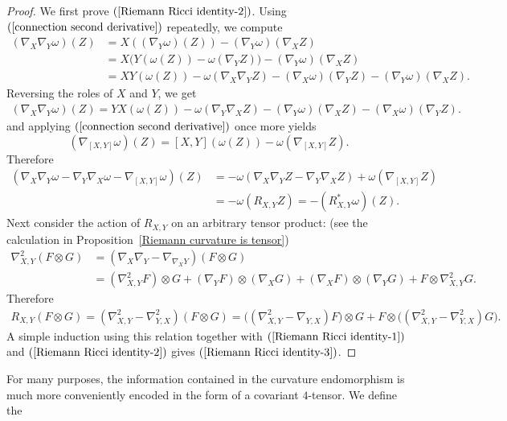 \begin{proof}
We first prove $(\ref{Riemann Ricci identity-2})$. Using $(\ref{connection second derivative})$ repeatedly, we compute
\begin{align*}
(\nabla_X\nabla_Y\omega)(Z)&=X((\nabla_Y\omega)(Z))-(\nabla_Y\omega)(\nabla_XZ)\\
&=X\big(Y(\omega(Z))-\omega(\nabla_YZ)\big)-(\nabla_Y\omega)(\nabla_XZ)\\
&=XY(\omega(Z))-\omega(\nabla_X\nabla_YZ)-(\nabla_X\omega)(\nabla_YZ)-(\nabla_Y\omega)(\nabla_XZ).
\end{align*}
Reversing the roles of $X$ and $Y$, we get
\begin{align*}
(\nabla_X\nabla_Y\omega)(Z)=YX(\omega(Z))-\omega(\nabla_Y\nabla_XZ)-(\nabla_Y\omega)(\nabla_XZ)-(\nabla_X\omega)(\nabla_YZ).
\end{align*}
and applying $(\ref{connection second derivative})$ once more yields
\[(\nabla_{[X,Y]}\omega)(Z)=[X,Y](\omega(Z))-\omega(\nabla_{[X,Y]}Z).\]
Therefore
\begin{align*}
(\nabla_{X}\nabla_Y\omega-\nabla_Y\nabla_X\omega-\nabla_{[X,Y]}\omega)(Z)&=-\omega(\nabla_X\nabla_YZ-\nabla_{Y}\nabla_XZ)+\omega(\nabla_{[X,Y]}Z)\\
&=-\omega(R_{X,Y}Z)=-(R_{X,Y}^*\omega)(Z).
\end{align*}
Next consider the action of $R_{X,Y}$ on an arbitrary tensor product: (see the calculation in Proposition~\ref{Riemann curvature is tensor})
\begin{align*}
\nabla^2_{X,Y}(F\otimes G)&=(\nabla_X\nabla_Y-\nabla_{\nabla_XY})(F\otimes G)\\
&=(\nabla_{X,Y}^2F)\otimes G+(\nabla_YF)\otimes(\nabla_XG)+(\nabla_XF)\otimes(\nabla_YG)+F\otimes\nabla_{X,Y}^2G.
\end{align*}
Therefore
\begin{equation*}
\begin{aligned}
R_{X,Y}(F\otimes G)=(\nabla_{X,Y}^2-\nabla_{Y,X}^2)(F\otimes G)=\big((\nabla_{X,Y}^2-\nabla_{Y,X})F\big)\otimes G+F\otimes\big((\nabla_{X,Y}^2-\nabla_{Y,X}^2)G\big).
\end{aligned}
\end{equation*}
A simple induction using this relation together with $(\ref{Riemann Ricci identity-1})$ and $(\ref{Riemann Ricci identity-2})$ gives $(\ref{Riemann Ricci identity-3})$.
\end{proof}
For many purposes, the information contained in the curvature endomorphism is much more conveniently encoded in the form of a covariant $4$-tensor. We define the 
